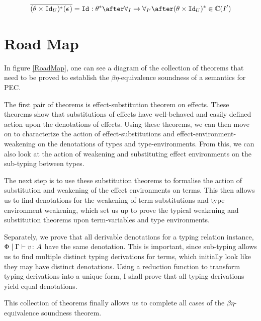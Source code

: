 \documentclass{Report}
\begin{document}
\begin{align}
    \bar{(\theta\times\Id{U})\star(\counit{})} = \Id{}: \theta\star\after\allI \rightarrow \allII\after(\theta\times\Id{U})\star\in \C(I')
\end{align}

\section{Road Map}
In figure \ref{RoadMap}, one can see a diagram of the collection of theorems that need to be proved to establish the $\beta\eta$-equivalence soundness of a semantics for PEC.


The first pair of theorems is effect-substitution theorem on effects. These theorems show that substitutions of effects have well-behaved and easily defined action upon the denotations of effects. Using these theorems, we can then move on to characterize the action of effect-substitutions and effect-environment-weakening on the denotations of types and type-environments. From this, we can also look at the action of weakening and substituting effect environments on the sub-typing between types.

The next step is to use these substitution theorems to formalise the action of substitution and weakening of the effect environments on terms. This then allows us to find denotations for the weakening of term-substitutions and type environment weakening, which set us up to prove the typical weakening and substitution theorems upon term-variables and type environments. 

Separately, we prove that all derivable denotations for a typing relation instance, $\Phi\mid\Gamma \vdash v \colon A$ have the same denotation. This is important, since sub-typing allows us to find multiple distinct typing derivations for terms, which initially look like they may have distinct denotations. Using a reduction function to transform typing derivations into a unique form, I shall prove that all typing derivations yield equal denotations.

This collection of theorems finally allows us to complete all cases of the $\beta\eta$-equivalence soundness theorem.
\end{document}
